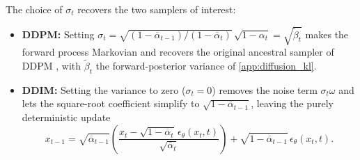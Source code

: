 The choice of $\sigma_t$ recovers the two samplers of interest:
\begin{itemize}
    \item \textbf{DDPM:} Setting $\sigma_t = \sqrt{(1 - \overline{\alpha}_{t-1}) / (1 - \overline{\alpha}_t)} \, \sqrt{1 - \alpha_t} = \sqrt{\tilde{\beta}_t}$ makes the forward process Markovian and recovers the original ancestral sampler of DDPM \parencite{ho_denoising_2020, song_denoising_2022}, with $\tilde{\beta}_t$ the forward-posterior variance of \autoref{app:diffusion_kl}.
    \item \textbf{DDIM:} Setting the variance to zero ($\sigma_t = 0$) removes the noise term $\sigma_t \omega$ and lets the square-root coefficient simplify to $\sqrt{1 - \overline{\alpha}_{t-1}}$, leaving the purely deterministic update
    \begin{equation}
    \label{eq:app_ddim_deterministic}
        x_{t-1} = \sqrt{\overline{\alpha}_{t-1}} \left( \frac{x_t - \sqrt{1-\overline{\alpha}_t}\,\epsilon_\theta(x_t, t)}{\sqrt{\overline{\alpha}_t}} \right) + \sqrt{1 - \overline{\alpha}_{t-1}}\, \epsilon_\theta(x_t, t).
    \end{equation}
\end{itemize}





